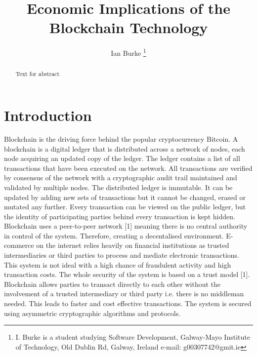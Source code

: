 \documentclass[report]{IEEEtran}
\begin{document}
\title{Economic Implications of the Blockchain Technology}
\author{Ian Burke %
\thanks{I. Burke is a student studying
Software Development, Galway-Mayo Institute of Technology, Old Dublin Rd, Galway, Ireland e-mail: g00307742@gmit.ie}%
}

\maketitle

\begin{abstract}
Text for abstract
\end{abstract}


\section{Introduction}
Blockchain is the driving force behind the popular cryptocurrency Bitcoin. A blockchain is a digital ledger that is distributed across a network of nodes, each node acquiring an updated copy of the ledger. The ledger contains a list of all transactions that have been executed on the network. All transactions are verified by consensus of the network with a cryptographic audit trail maintained and validated by multiple nodes. The distributed ledger is immutable. It can be updated by adding new sets of transactions but it cannot be changed, erased or mutated any further. Every transaction can be viewed on the public ledger, but the identity of participating parties behind every transaction is kept hidden. Blockchain uses a peer-to-peer network [1] meaning there is no central authority in control of the system. Therefore, creating a decentalised environment. E-commerce on the internet relies heavily on financial institutions as trusted intermediaries or third parties to process and mediate electronic transactions. This system is not ideal with a high chance of fraudulent activity and high transaction costs. The whole security of the system is based on a trust model [1]. Blockchain allows parties to transact directly to each other without the involvement of a trusted intermediary or third party i.e. there is no middleman needed. This leads to faster and cost effective transactions. The system is secured using asymmetric cryptographic algorithms and protocols.
\end{document}
